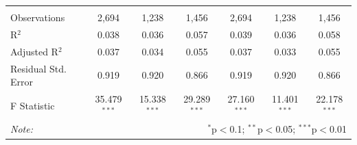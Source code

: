 \documentclass[alpha-refs]{wiley-article-01g}
\begin{document}
\begin{landscape}
\begin{table}[!htbp]
\begin{tabular}{@{\extracolsep{5pt}}lcccccc}
  & & & & & & \\ 
\hline \\[-.8ex] 
Observations & 2,694 & 1,238 & 1,456 & 2,694 & 1,238 & 1,456 \\ 
R$^{2}$ & 0.038 & 0.036 & 0.057 & 0.039 & 0.036 & 0.058 \\ 
Adjusted R$^{2}$ & 0.037 & 0.034 & 0.055 & 0.037 & 0.033 & 0.055 \\ 
Residual Std. Error & 0.919 & 0.920 & 0.866 & 0.919 & 0.920 & 0.866 \\ 
F Statistic & 35.479$^{***}$ & 15.338$^{***}$ & 29.289$^{***}$ & 27.160$^{***}$ & 11.401$^{***}$ & 22.178$^{***}$ \\ 
\hline 
\textit{Note:}  & \multicolumn{6}{r}{$^{*}$p$<$0.1; $^{**}$p$<$0.05; $^{***}$p$<$0.01} \\ 
\end{tabular} 
\end{table} 

\end{landscape}

\newpage
\end{document}

